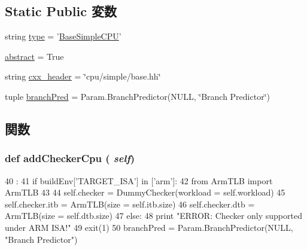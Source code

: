 \subsection*{Static Public 変数}
\begin{DoxyCompactItemize}
\item 
string \hyperlink{classBaseSimpleCPU_1_1BaseSimpleCPU_acce15679d830831b0bbe8ebc2a60b2ca}{type} = '\hyperlink{classBaseSimpleCPU_1_1BaseSimpleCPU}{BaseSimpleCPU}'
\item 
\hyperlink{classBaseSimpleCPU_1_1BaseSimpleCPU_a17fa61ac3806b481cafee5593b55e5d0}{abstract} = True
\item 
string \hyperlink{classBaseSimpleCPU_1_1BaseSimpleCPU_a17da7064bc5c518791f0c891eff05fda}{cxx\_\-header} = \char`\"{}cpu/simple/base.hh\char`\"{}
\item 
tuple \hyperlink{classBaseSimpleCPU_1_1BaseSimpleCPU_ac566dd90d96e45183abc6f54c960ffec}{branchPred} = Param.BranchPredictor(NULL, \char`\"{}Branch Predictor\char`\"{})
\end{DoxyCompactItemize}


\subsection{関数}
\hypertarget{classBaseSimpleCPU_1_1BaseSimpleCPU_a97c178b398a7fc7e24932f2058d14381}{
\subsubsection[{addCheckerCpu}]{\setlength{\rightskip}{0pt plus 5cm}def addCheckerCpu ( {\em self})}}
\label{classBaseSimpleCPU_1_1BaseSimpleCPU_a97c178b398a7fc7e24932f2058d14381}



\begin{DoxyCode}
40                            :
41         if buildEnv['TARGET_ISA'] in ['arm']:
42             from ArmTLB import ArmTLB
43 
44             self.checker = DummyChecker(workload = self.workload)
45             self.checker.itb = ArmTLB(size = self.itb.size)
46             self.checker.dtb = ArmTLB(size = self.dtb.size)
47         else:
48             print "ERROR: Checker only supported under ARM ISA!"
49             exit(1)
50 
    branchPred = Param.BranchPredictor(NULL, "Branch Predictor")
\end{DoxyCode}


